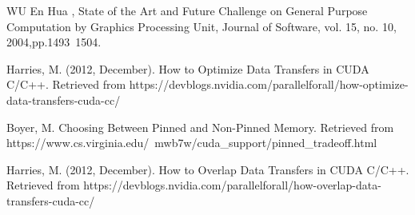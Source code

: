 \documentclass[journal,11pt,onecolumn,draftclsnofoot]{ieeeconf}  %
\begin{document}
\clearpage

\begin{thebibliography}{9}
WU En Hua , State of the Art and Future Challenge on General 
Purpose Computation by Graphics Processing Unit, Journal of 
Software, vol. 15, no. 10, 2004,pp.1493~1504.

Harries, M. (2012, December). How to Optimize Data Transfers in CUDA C/C++. Retrieved from https://devblogs.nvidia.com/parallelforall/how-optimize-data-transfers-cuda-cc/
	
Boyer, M. Choosing Between Pinned and Non-Pinned Memory. Retrieved from https://www.cs.virginia.edu/~mwb7w/cuda_support/pinned_tradeoff.html
	
Harries, M. (2012, December). How to Overlap Data Transfers in CUDA C/C++. Retrieved from https://devblogs.nvidia.com/parallelforall/how-overlap-data-transfers-cuda-cc/
	

\end{thebibliography}
\end{document}
